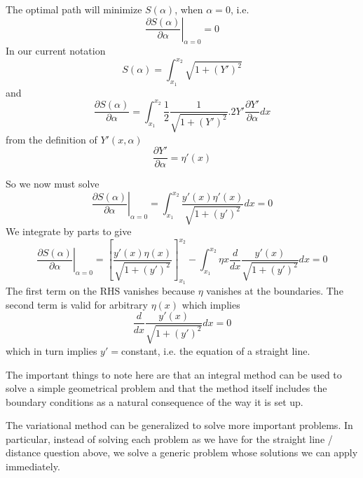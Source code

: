 \documentclass[10pt]{article}
\begin{document}
		The optimal path will minimize	 $S(\alpha)$, when $\alpha=0$, i.e.
			\begin{equation}
				\left. \frac{\partial S(\alpha)}{\partial \alpha} \right|_{\alpha = 0} = 0
			\end{equation}
		In our current notation
			\begin{equation}
				S(\alpha) = \int_{x_1}^{x_2} \sqrt{1 + (Y')^2}
			\end{equation}
		and 
			\begin{equation}
				\frac{\partial S(\alpha)}{\partial \alpha} = 
					\int_{x_1}^{x_2}  \frac{1}{2} \frac{1}{\sqrt{1 + (Y')^2}} . 2 Y' \frac{\partial Y'}{\partial \alpha} dx
			\end{equation}
		from the definition of $Y'(x,\alpha)$
			\begin{equation}
				\frac{\partial Y'}{\partial \alpha} = \eta'(x)
			\end{equation}
	
		So we now must solve
			\begin{equation}
				\left. \frac{\partial S(\alpha)}{\partial \alpha} \right|_{\alpha = 0} =
					\int_{x_1}^{x_2} \frac{y'(x)\eta'(x)}{\sqrt{1 + (y')^2}} dx = 0
			\end{equation}
		We integrate by parts to give
			\begin{equation}
				\left. \frac{\partial S(\alpha)}{\partial \alpha} \right|_{\alpha = 0} =
					\left[   \frac{y'(x)\eta(x)}{\sqrt{1 + (y')^2}} \right]_{x_1}^{x_2} - 
					\int_{x_1}^{x_2} \eta{x} \frac{d}{dx} \frac{y'(x)}{\sqrt{1 + (y')^2}} dx = 0
			\end{equation}
		The first term on the RHS vanishes because $\eta$ vanishes at the boundaries. The
		second term is valid for arbitrary $\eta(x)$ which implies
			\begin{equation}	
				 \frac{d}{dx} \frac{y'(x)}{\sqrt{1 + (y')^2}} dx = 0
			\end{equation}
		which in turn implies $y'=$constant, i.e. the equation of
		a straight line. 
		
		The important things to note here are that an integral method can be used
		to solve a simple geometrical problem and that the method itself
		includes the boundary conditions as a natural consequence of the way
		it is set up.
		
		The variational method can be generalized to solve more important problems.
		In particular, instead of solving each problem as we have for the straight
		line / distance question above, we solve a generic problem whose solutions
		we can apply immediately.
		
\end{document}

